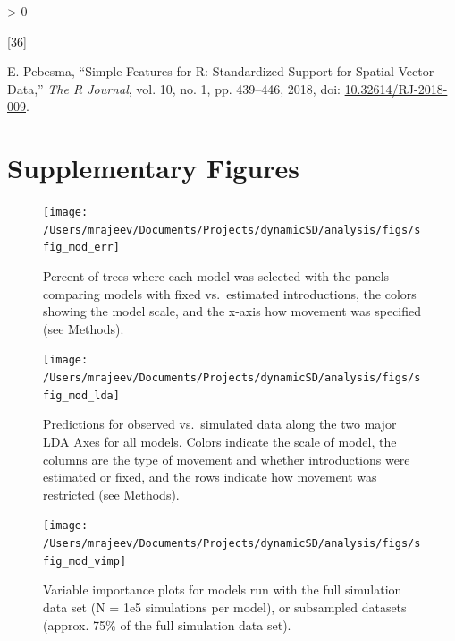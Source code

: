 \documentclass[
  oneside]{book}
\newcommand{\beginsupplement}{
  \setcounter{table}{0}  
  \renewcommand{\thetable}{S\arabic{chapter}.\arabic{table}} 
  \setcounter{figure}{0} 
  \renewcommand{\thefigure}{S\arabic{chapter}.\arabic{figure}}
}
\newlength{\cslhangindent}
\newlength{\csllabelwidth}
\newenvironment{CSLReferences}[2] %
 {%
  \setlength{\parindent}{0pt}
  \ifodd #1 \everypar{\setlength{\hangindent}{\cslhangindent}}\ignorespaces\fi
  \ifnum #2 > 0
  \setlength{\parskip}{#2\baselineskip}
  \fi
 }%
 {}
\newcommand{\CSLLeftMargin}[1]{\parbox[t]{\csllabelwidth}{#1}}
\newcommand{\CSLRightInline}[1]{\parbox[t]{\linewidth - \csllabelwidth}{#1}\break}
\begin{document}
\begin{CSLReferences}{0}{0}
\leavevmode\hypertarget{ref-sf2018}{}%
\CSLLeftMargin{{[}36{]} }
\CSLRightInline{E. Pebesma, {``{Simple Features for R: Standardized Support for Spatial Vector Data},''} \emph{{The R Journal}}, vol. 10, no. 1, pp. 439--446, 2018, doi: \href{https://doi.org/10.32614/RJ-2018-009}{10.32614/RJ-2018-009}.}

\end{CSLReferences}

\newpage

\hypertarget{supplementary-figures-1}{%
\section{Supplementary Figures}\label{supplementary-figures-1}}

\beginsupplement

\setlength{\parskip}{2em}

\begin{figure}
\texttt{[image: /Users/mrajeev/Documents/Projects/dynamicSD/analysis/figs/sfig\_mod\_err]} \caption[Percent of trees where each model was selected.]{Percent of trees where each model was selected with the panels comparing models with fixed vs.~estimated introductions, the colors showing the model scale, and the x-axis how movement was specified (see Methods).}\label{fig:sfig-mod-ranks}
\end{figure}



\begin{figure}
\texttt{[image: /Users/mrajeev/Documents/Projects/dynamicSD/analysis/figs/sfig\_mod\_lda]} \caption[Predicions for observed vs. simulated data along the two major LDA Axes for all models.]{Predictions for observed vs.~simulated data along the two major LDA Axes for all models. Colors indicate the scale of model, the columns are the type of movement and whether introductions were estimated or fixed, and the rows indicate how movement was restricted (see Methods).}\label{fig:sfig-mod-lda}
\end{figure}



\begin{figure}
\texttt{[image: /Users/mrajeev/Documents/Projects/dynamicSD/analysis/figs/sfig\_mod\_vimp]} \caption[Variable importance plots for parameters with full or subsampled simulations.]{Variable importance plots for models run with the full simulation data set (N = 1e5 simulations per model), or subsampled datasets (approx. 75\% of the full simulation data set).}\label{fig:sfig-mod-vimp}
\end{figure}
\end{document}

